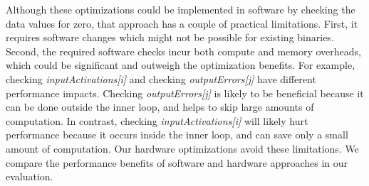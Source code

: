 Although these optimizations could be implemented in software by checking the data values for zero, that approach has a couple of practical limitations.   First, it requires software changes which might not be possible for existing binaries.   Second, the required software checks incur both compute and memory overheads, which could be significant and outweigh the optimization benefits.  For example, checking \emph{inputActivations[i]} and checking \emph{outputErrors[j]} have different performance impacts.  Checking \emph{outputErrors[j]} is likely to be beneficial because it can be done outside the inner loop, and helps to skip large amounts of computation. In contrast, checking \emph{inputActivations[i]} will likely hurt performance because it occurs inside the inner loop, and can save only a small amount of computation. Our hardware optimizations  avoid these limitations.  We compare the performance benefits of software and hardware  approaches in our evaluation. 



